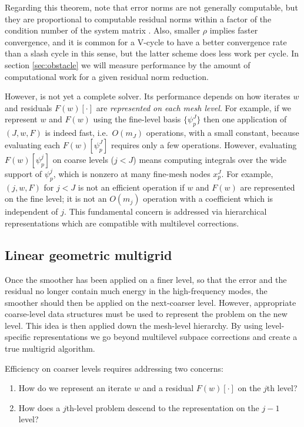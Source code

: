 \documentclass[letterpaper,final,12pt,reqno]{amsart}
\theoremstyle{claim}
\numberwithin{equation}{section}
\numberwithin{figure}{section}
\numberwithin{table}{section}
\numberwithin{theorem}{section}
\begin{document}
Regarding this theorem, note that error norms are not generally computable, but they are proportional to computable residual norms within a factor of the condition number of the system matrix \cite[Chapter 2]{Bueler2016}.  Also, smaller $\rho$ implies faster convergence, and it is common for a V-cycle to have a better convergence rate than a slash cycle in this sense, but the latter scheme does less work per cycle.  In section \ref{sec:obstacle} we will measure performance by the amount of computational work for a given residual norm reduction.

However,  is not yet a complete solver.  Its performance depends on how iterates $w$ and residuals $F(w)[\cdot]$ are \emph{represented on each mesh level}.  For example, if we represent $w$ and $F(w)$ using the fine-level basis $\{\psi_p^J\}$ then one application of $(J,w,F)$ is indeed fast, i.e.~$O(m_J)$ operations, with a small constant, because evaluating each $F(w)[\psi_p^J]$ requires only a few operations.  However, evaluating $F(w)[\psi_p^j]$ on coarse levels ($j<J$) means computing integrals over the wide support of $\psi_p^j$, which is nonzero at many fine-mesh nodes $x_p^J$.  For example, $(j,w,F)$ for $j<J$ is not an efficient operation if $w$ and $F(w)$ are represented on the fine level; it is not an $O(m_j)$ operation with a coefficient which is independent of $j$.  This fundamental concern is addressed via hierarchical representations which are compatible with multilevel corrections.

\subsection*{Linear geometric multigrid}  Once the smoother has been applied on a finer level, so that the error and the residual no longer contain much energy in the high-frequency modes, the smoother should then be applied on the next-coarser level.  However, appropriate coarse-level data structures must be used to represent the problem on the new level.  This idea is then applied down the mesh-level hierarchy.  By using level-specific representations we go beyond multilevel subpace corrections and create a true multigrid algorithm.

Efficiency on coarser levels requires addressing two concerns:
\renewcommand{\labelenumi}{\emph{\roman{enumi})}}
\begin{enumerate}
\item How do we represent an iterate $w$ and a residual $F(w)[\cdot]$ on the $j$th level?
\item How does a $j$th-level problem descend to the representation on the $j-1$ level?
\end{enumerate}
\end{document}
